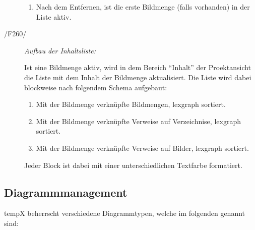\begin{description}
\begin{enumerate}
				\item Nach dem Entfernen, ist die erste Bildmenge (falls vorhanden) in der Liste aktiv.
			
			\end{enumerate}

		\item[/F260/] \textit{Aufbau der Inhaltsliste:}\par Ist eine Bildmenge aktiv, wird in dem Bereich "`Inhalt"' der Proektansicht die Liste mit dem Inhalt der Bildmenge aktualisiert. Die Liste wird dabei blockweise nach folgendem Schema aufgebaut:
		
			\begin{enumerate}
			
				\item Mit der Bildmenge verknüpfte Bildmengen, \gls{lexgraph} sortiert.
			
				\item Mit der Bildmenge verknüpfte Verweise auf Verzeichnise, \gls{lexgraph} sortiert.
				
				\item Mit der Bildmenge verknüpfte Verweise auf Bilder, \gls{lexgraph} sortiert.
				
			\end{enumerate}
			
			Jeder Block ist dabei mit einer unterschiedlichen Textfarbe formatiert.
		
	\end{description}

\subsection{Diagrammmanagement}

\label{subsec:diagrammmgmt}

	\gls{tempX} beherrscht verschiedene Diagrammtypen, welche im folgenden genannt sind:
	
